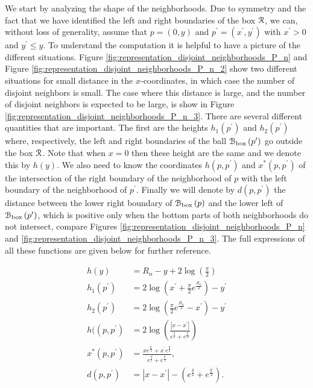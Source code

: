 We start by analyzing the shape of the neighborhoods. Due to symmetry and the fact that we have identified the left and right boundaries of the box ${\mathcal R}$, we can, without loss of generality, assume that $p = (0,y)$ and $p^\prime = (x^\prime,y^\prime)$ with $x^\prime > 0$ and $y^\prime \le y$. To understand the computation it is helpful to have a picture of the different situations. Figure \ref{fig:representation_disjoint_neighborhoods_P_n} and Figure \ref{fig:representation_disjoint_neighborhoods_P_n_2} show two different situations for small distance in the $x$-coordinates, in which case the number of disjoint neighbors is small. The case where this distance is large, and the number of disjoint neighbors is expected to be large, is show in Figure \ref{fig:representation_disjoint_neighborhoods_P_n_3}. There are several different quantities that are important. The first are the heights $h_1(p^\prime)$ and $h_2(p^\prime)$ where, respectively, the left and right boundaries of the ball ${\mathcal B}_{\text{box}}\left(p^\prime\right)$ go outside the box ${\mathcal R}$. Note that when $x = 0$ then these height are the same and we denote this by $h(y)$. We also need to know the coordinates $h(p,p^\prime)$ and $x^\ast(p,p^\prime)$ of the intersection of the right boundary of the neighborhood of $p$ with the left boundary of the neighborhood of $p^\prime$. Finally we will denote by $d(p,p^\prime)$ the distance between the lower right boundary of ${\mathcal B}_{\text{box}}\left(p\right)$ and the lower left of ${\mathcal B}_{\text{box}}\left(p^\prime\right)$, which is positive only when the bottom parts of both neighborhoods do not intersect, compare Figures \ref{fig:representation_disjoint_neighborhoods_P_n} and \ref{fig:representation_disjoint_neighborhoods_P_n_3}. The full expressions of all these functions are given below for further reference.

\begin{align}
	h(y) &= R_n - y + 2\log\left(\frac{\pi}{2}\right) \label{eq:def_height_y_P_n}\\
	h_1(p^\prime) &= 2\log\left(x^\prime + \frac{\pi}{2}e^{\frac{R_n}{2}}\right) - y^\prime \label{eq:def_height_left_P_n} \\
	h_2(p^\prime) &= 2\log\left(\frac{\pi}{2}e^{\frac{R_n}{2}} - x^\prime\right) - y^\prime 
		\label{eq:def_height_right_P_n} \\
	h((p,p^\prime) &= 2\log\left(\frac{|x - x^\prime|}{e^{\frac{y}{2}} + e^{\frac{y^\prime}{2}}}\right)\\
	x^\ast(p,p^\prime) &= \frac{x e^{\frac{y^\prime}{2}} + x^\prime e^{\frac{y}{2}}}{e^{\frac{y}{2}} + 	
		e^{\frac{y^\prime}{2}}},\\
	d(p,p^\prime) &= |x - x^\prime| - \left(e^{\frac{y}{2}} + e^{\frac{y^\prime}{2}}\right).
	\label{eq:def_d_p_p_prime}
\end{align}

